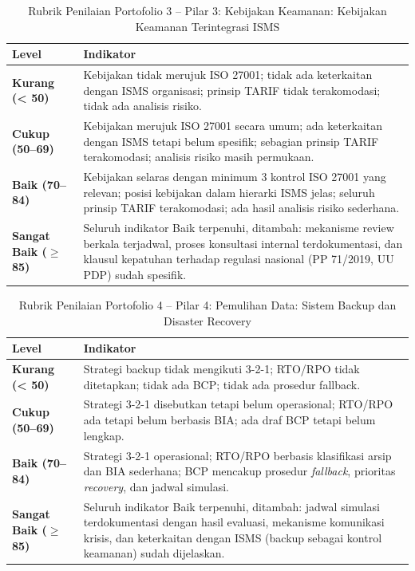 \documentclass[12pt,a4paper]{report}
\begin{document}
\begin{table}[htbp]
\centering
\small
\caption{Rubrik Penilaian Portofolio 3 -- Pilar 3: Kebijakan Keamanan: Kebijakan Keamanan Terintegrasi ISMS}
\label{tab:rubrik-3}
\begin{tabularx}{\textwidth}{@{} l X @{}}
\toprule
\textbf{Level} & \textbf{Indikator} \\
\midrule
\textbf{Kurang (< 50)} & Kebijakan tidak merujuk ISO 27001; tidak ada keterkaitan dengan ISMS organisasi; prinsip TARIF tidak terakomodasi; tidak ada analisis risiko. \\
\textbf{Cukup (50--69)} & Kebijakan merujuk ISO 27001 secara umum; ada keterkaitan dengan ISMS tetapi belum spesifik; sebagian prinsip TARIF terakomodasi; analisis risiko masih permukaan. \\
\textbf{Baik (70--84)} & Kebijakan selaras dengan minimum 3 kontrol ISO 27001 yang relevan; posisi kebijakan dalam hierarki ISMS jelas; seluruh prinsip TARIF terakomodasi; ada hasil analisis risiko sederhana. \\
\textbf{Sangat Baik ($\geq$ 85)} & Seluruh indikator Baik terpenuhi, ditambah: mekanisme review berkala terjadwal, proses konsultasi internal terdokumentasi, dan klausul kepatuhan terhadap regulasi nasional (PP 71/2019, UU PDP) sudah spesifik. \\
\bottomrule
\end{tabularx}
\end{table}

\begin{table}[htbp]
\centering
\small
\caption{Rubrik Penilaian Portofolio 4 -- Pilar 4: Pemulihan Data: Sistem Backup dan Disaster Recovery}
\label{tab:rubrik-4}
\begin{tabularx}{\textwidth}{@{} l X @{}}
\toprule
\textbf{Level} & \textbf{Indikator} \\
\midrule
\textbf{Kurang (< 50)} & Strategi backup tidak mengikuti 3-2-1; RTO/RPO tidak ditetapkan; tidak ada BCP; tidak ada prosedur fallback. \\
\textbf{Cukup (50--69)} & Strategi 3-2-1 disebutkan tetapi belum operasional; RTO/RPO ada tetapi belum berbasis BIA; ada draf BCP tetapi belum lengkap. \\
\textbf{Baik (70--84)} & Strategi 3-2-1 operasional; RTO/RPO berbasis klasifikasi arsip dan BIA sederhana; BCP mencakup prosedur \textit{fallback}, prioritas \textit{recovery}, dan jadwal simulasi. \\
\textbf{Sangat Baik ($\geq$ 85)} & Seluruh indikator Baik terpenuhi, ditambah: jadwal simulasi terdokumentasi dengan hasil evaluasi, mekanisme komunikasi krisis, dan keterkaitan dengan ISMS (backup sebagai kontrol keamanan) sudah dijelaskan. \\
\bottomrule
\end{tabularx}
\end{table}
\end{document}
